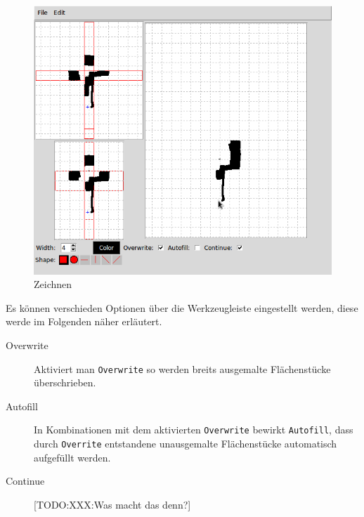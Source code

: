 \begin{figure}[htbp]
  \centering
  \includegraphics[scale=0.5]{03_pics/zeichnen.png}
  \caption{Zeichnen}
  \label{fig:zeichnen}
\end{figure}

Es können verschieden Optionen über die Werkzeugleiste eingestellt werden, diese werde im Folgenden näher erläutert.

\begin{description}
  \item [Overwrite] Aktiviert man \texttt{Overwrite} so werden breits ausgemalte Flächenstücke überschrieben.
  \item [Autofill] In Kombinationen mit dem aktivierten \texttt{Overwrite} bewirkt \texttt{Autofill}, dass durch \texttt{Overrite} entstandene unausgemalte Flächenstücke automatisch aufgefüllt werden.
  \item [Continue] [TODO:XXX:Was macht das denn?]
\end{description}




